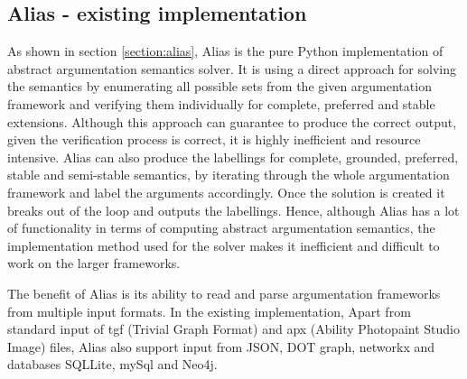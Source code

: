 \subsection{Alias - existing implementation}
As shown in section \ref{section:alias}, Alias \citep{alias} is the pure Python implementation of abstract argumentation semantics solver. It is using a direct approach for solving the semantics by enumerating all possible sets from the given argumentation framework and verifying them individually for complete, preferred and stable extensions. Although this approach can guarantee to produce the correct output, given the verification process is correct, it is highly inefficient and resource intensive. Alias can also produce the labellings for complete, grounded, preferred, stable and semi-stable semantics, by iterating through the whole argumentation framework and label the arguments accordingly. Once the solution is created it breaks out of the loop and outputs the labellings. Hence, although Alias has a lot of functionality in terms of computing abstract argumentation semantics, the implementation method used for the solver makes it inefficient and difficult to work on the larger frameworks. 

The benefit of Alias is its ability to read and parse argumentation frameworks from multiple input formats. In the existing implementation, Apart from standard input of tgf (Trivial Graph Format) and apx (Ability Photopaint Studio Image) files, Alias also support input from JSON, DOT graph, networkx and databases SQLLite, mySql and Neo4j. 

